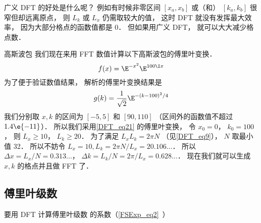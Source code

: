 广义 DFT 的好处是什么呢？ 例如有时候非零区间 $[x_a, x_b]$ 或（和） $[k_a, k_b]$ 很窄但却远离原点， 则 $L_k$ 或 $L_x$ 仍需取较大的值， 这时 DFT 就没有发挥最大效率， 因为大部分格点的函数值都是 0． 但如果用广义 DFT， 就可以大大减少格点数．

\begin{example}{高斯波包}
我们现在来用 FFT 数值计算以下高斯波包的傅里叶变换．
\begin{equation}
f(x) = \E^{-x^2}\E^{100 \I x}
\end{equation}
为了便于验证数值结果， 解析的傅里叶变换结果是%
\begin{equation}
g(k) = \frac{1}{\sqrt2}\E^{-(k-100)^2/4}
\end{equation}
我们分别取 $x, k$ 的区间为 $[-5, 5]$ 和 $[90, 110]$ （区间外的函数值不超过 $1.4\e{-11}$）． 所以我们采用\autoref{DFT_eq21} 的傅里叶变换， 令 $x_0 = 0$， $k_0 = 100$， 则 $L_x \geqslant 10$， $L_k \geqslant 20$． 为了满足 $L_x L_k = 2\pi N$ （见\autoref{DFT_eq9}）， $N$ 取最小值 32． 所以不妨令 $L_x = 10, L_k = 2\pi N/L_x = 20.106...$．
所以 $\Delta x = L_x/N = 0.313...$， $\Delta k = L_k/N = 2\pi/L_x = 0.628...$． 现在我们就可以生成 $x, k$ 的格点并且做 FFT 了．
\end{example}

\subsection{傅里叶级数}
要用 DFT 计算傅里叶级数 的系数（\autoref{FSExp_eq2}~）

